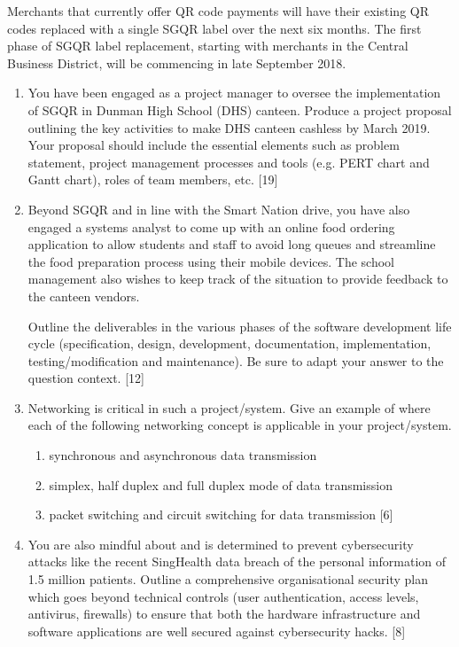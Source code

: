 Merchants that currently offer QR code payments will have their existing
QR codes replaced with a single SGQR label over the next six months.
The first phase of SGQR label replacement, starting with merchants
in the Central Business District, will be commencing in late September
2018.
\begin{enumerate}
\item You have been engaged as a project manager to oversee the implementation
of SGQR in Dunman High School (DHS) canteen. Produce a project proposal
outlining the key activities to make DHS canteen cashless by March
2019. Your proposal should include the essential elements such as
problem statement, project management processes and tools (e.g. PERT
chart and Gantt chart), roles of team members, etc. \hfill{}{[}19{]}
\item Beyond SGQR and in line with the Smart Nation drive, you have also
engaged a systems analyst to come up with an online food ordering
application to allow students and staff to avoid long queues and streamline
the food preparation process using their mobile devices. The school
management also wishes to keep track of the situation to provide feedback
to the canteen vendors. 

Outline the deliverables in the various phases of the software development
life cycle (specification, design, development, documentation, implementation,
testing/modification and maintenance). Be sure to adapt your answer
to the question context. \hfill{}{[}12{]}
\item Networking is critical in such a project/system. Give an example of
where each of the following networking concept is applicable in your
project/system.
\begin{enumerate}
\item synchronous and asynchronous data transmission
\item simplex, half duplex and full duplex mode of data transmission
\item packet switching and circuit switching for data transmission \hfill{}{[}6{]}
\end{enumerate}
\item You are also mindful about and is determined to prevent cybersecurity
attacks like the recent SingHealth data breach of the personal information
of 1.5 million patients. Outline a comprehensive organisational security
plan which goes beyond technical controls (user authentication, access
levels, antivirus, firewalls) to ensure that both the hardware infrastructure
and software applications are well secured against cybersecurity hacks.\hfill{}
{[}8{]}
\end{enumerate}